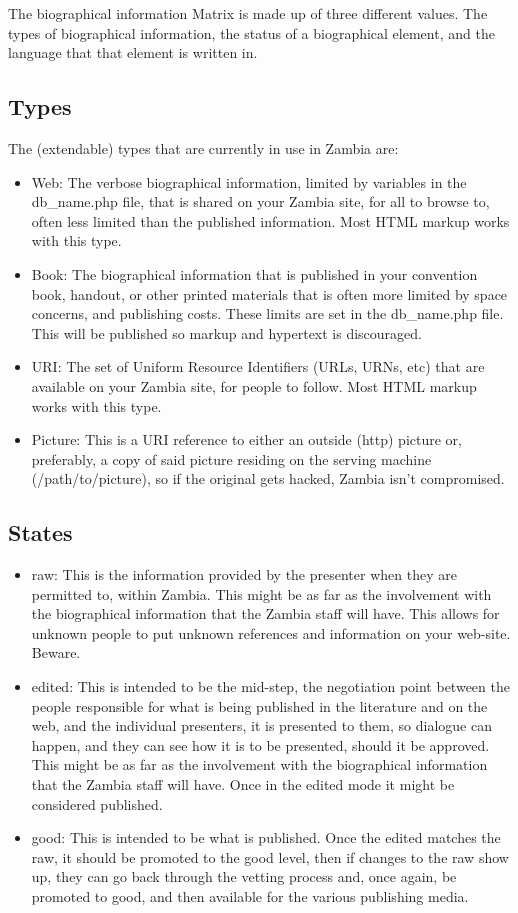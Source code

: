 \documentclass[captions=tablesignature]{scrartcl}
\begin{document}
The biographical information Matrix is made up of three different
values.  The types of biographical information, the status of a
biographical element, and the language that that element is written
in.
\subsection{Types}
\label{sec-2-1}

The (extendable) types that are currently in use in Zambia are:
\begin{itemize}
\item Web: The verbose biographical information, limited by variables
in the db\_name.php file, that is shared on your Zambia site, for
all to browse to, often less limited than the published
information.  Most HTML markup works with this type.
\item Book: The biographical information that is published in your
convention book, handout, or other printed materials that is
often more limited by space concerns, and publishing costs.
These limits are set in the db\_name.php file.  This will be
published so markup and hypertext is discouraged.
\item URI: The set of Uniform Resource Identifiers (URLs, URNs, etc)
that are available on your Zambia site, for people to follow.
Most HTML markup works with this type.
\item Picture: This is a URI reference to either an outside (http)
picture or, preferably, a copy of said picture residing on the
serving machine (/path/to/picture), so if the original gets
hacked, Zambia isn't compromised.
\end{itemize}

\subsection{States}
\label{sec-2-2}
\begin{itemize}
\item raw: This is the information provided by the presenter when they
are permitted to, within Zambia.  This might be as far as the
involvement with the biographical information that the Zambia
staff will have.  This allows for unknown people to put unknown
references and information on your web-site.  Beware.
\item edited: This is intended to be the mid-step, the negotiation
point between the people responsible for what is being published
in the literature and on the web, and the individual presenters,
it is presented to them, so dialogue can happen, and they can see
how it is to be presented, should it be approved.  This might be
as far as the involvement with the biographical information that
the Zambia staff will have.  Once in the edited mode it might be
considered published.
\item good: This is intended to be what is published.  Once the edited
matches the raw, it should be promoted to the good level, then if
changes to the raw show up, they can go back through the vetting
process and, once again, be promoted to good, and then available
for the various publishing media.
\end{itemize}
\end{document}
